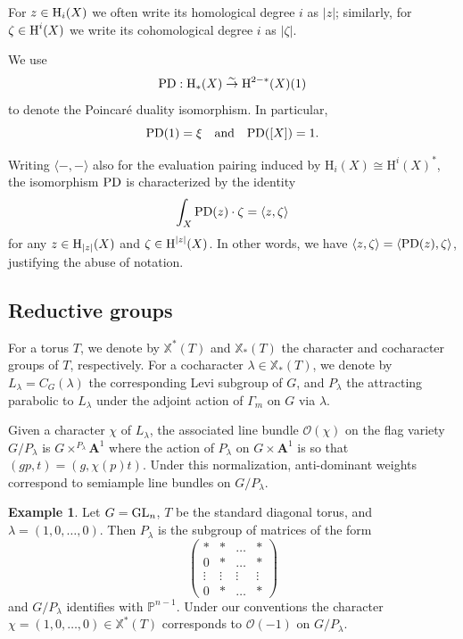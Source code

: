 \documentclass[reqno]{amsart}
\numberwithin{equation}{subsection}
\theoremstyle{definition}
\newtheorem{exam}[subsubsection]{Example}
\def\PP{\mathbb{P}}
\newcommand\cO{\mathcal{O}}
\newcommand{\A}{\mathbf{A}}
\newcommand\GL{\textup{GL}}
\newcommand\xch{\mathbb{X}^*}
\newcommand\xcoch{\mathbb{X}_*}
\renewcommand{\j}[1]{\langle{#1}\rangle}
\newcommand{\homog}[2]{\textup{H}_{#1}({#2})}  %
\newcommand{\cohog}[2]{\textup{H}^{#1}({#2})}     %
\newcommand{\isom}{\stackrel{\sim}{\to}}
\newcommand\G\Gamma
\newcommand{\z}{\zeta}
\newcommand\PD{\textup{PD}}
\newcommand{\rH}{\ensuremath{\mathrm{H}}\xspace}
\begin{document}
For $z\in \homog{i}{X}$ we often write its homological degree $i$ as $|z|$; similarly, for $\z\in \cohog{i}{X}$ we write its cohomological degree $i$ as $|\z|$.

We use 
\begin{equation*}
\PD: \homog{*}{X}\isom \cohog{2-*}{X}(1)
\end{equation*}
to denote the Poincar\'e duality isomorphism. In particular, 
\begin{equation}\label{eq:xi}
\PD(1)=\xi \quad \text{and} \quad  \PD([X])=1.
\end{equation}

Writing $\j{-, -}$ also for the evaluation pairing induced by $\rH_i(X) \cong \rH^i(X)^*$, the isomorphism $\PD$ is characterized by the identity
\begin{equation*}
\int_{X}\PD(z)\cdot\z=\j{z,\z}
\end{equation*}
for any $z\in \homog{|z|}{X}$ and $\z\in\cohog{|z|}{X}$. In other words, we have $\j{z, \z} = \j{\PD(z), \z}$, justifying the abuse of notation. 

\subsection{Reductive groups}\label{sssec:reductive-groups-notation}
For a torus $T$, we denote by $\xch(T)$ and $\xcoch(T)$ the character and cocharacter groups of $T$, respectively. For a cocharacter $\lambda \in \xcoch(T)$, we denote by $L_\lambda = C_G(\lambda)$ the corresponding Levi subgroup of $G$, and $P_\lambda$ the attracting parabolic to $L_\lambda$ under the adjoint action of $\G_m$ on $G$ via $\lambda$. 


Given a character $\chi$ of $L_\lambda$, the associated line bundle $\cO(\chi)$ on the flag variety $G/P_\lambda$ is $G \times^{P_\lambda} \A^1$ where the action of $P_\lambda$ on $G \times \A^1$ is so that $(gp, t) = (g, \chi(p) t)$. Under this normalization, anti-dominant weights correspond to semiample line bundles on $G/P_\lambda$.

\begin{exam}\label{ex:parabolic-line}
Let $G = \GL_n$, $T$ be the standard diagonal torus, and $\lambda = (1, 0, \ldots, 0)$. Then $P_\lambda$ is the subgroup of matrices of the form 
\[
\begin{pmatrix} 
* & * & \ldots & * \\
0 & * & \ldots & * \\
\vdots & \vdots & \vdots & \vdots \\
0 & * & \ldots & * 
\end{pmatrix} 
\]
and $G/P_\lambda$ identifies with $\PP^{n-1}$. Under our conventions the character $\chi = (1, 0, \ldots, 0) \in \xch(T)$ corresponds to $\cO(-1)$ on $G/P_\lambda$.
\end{exam}
\end{document}
